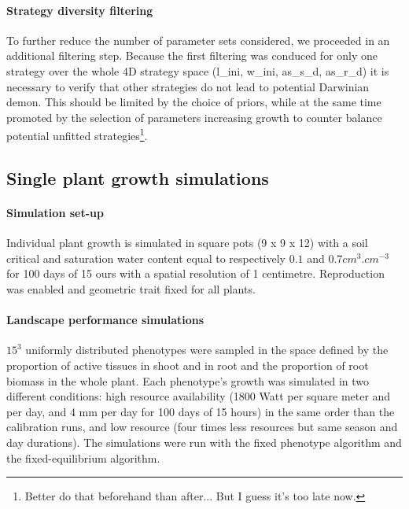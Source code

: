 \documentclass[review]{elsarticle}
\begin{document}
\paragraph{Strategy diversity filtering}
To further reduce the number of parameter sets considered, we proceeded in an additional filtering step. Because the first filtering was conduced for only one strategy over the whole 4D strategy space (l\_ini,  w\_ini, as\_s\_d, as\_r\_d) it is necessary to verify that other strategies do not lead to potential Darwinian demon. This should be limited by the choice of priors, while at the same time promoted by the selection of parameters increasing growth to counter balance potential unfitted strategies\footnote{Better do that beforehand than after... But I guess it's too late now.}.

\subsection{Single plant growth simulations}
\paragraph{Simulation set-up}
Individual plant growth is simulated in square pots (9 x 9 x 12) with a soil critical and saturation water content equal to respectively $0.1$ and $0.7 cm^{3}.cm^{-3}$ for 100 days of 15 ours with a spatial resolution of 1 centimetre. Reproduction was enabled and geometric trait fixed for all plants.

\paragraph{Landscape performance simulations}
$15^{3}$ uniformly distributed phenotypes were sampled in the space defined by the proportion of active tissues in shoot and in root and the proportion of root biomass in the whole plant. Each phenotype's growth was simulated in two different conditions: high resource availability (1800 Watt per square meter and per day, and 4 mm per day for 100 days of 15 hours) in the same order than the calibration runs, and low resource (four times less resources but same season and day durations). The simulations were run with the fixed phenotype algorithm and the fixed-equilibrium algorithm.
\end{document}

